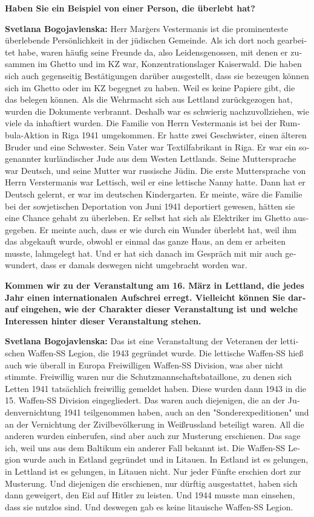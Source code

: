 \begin{otherlanguage}{ngerman}
\textbf{Haben Sie ein Beispiel von einer Person, die überlebt hat?}

\textbf{Svetlana Bogojavlenska:}  Herr Marģers Vestermanis ist die prominenteste überlebende Persönlichkeit in der jüdischen Gemeinde. Als ich dort noch gearbeitet habe, waren häufig seine Freunde da, also Leidensgenossen, mit denen er zusammen im Ghetto und im KZ war, Konzentrationslager Kaiserwald. Die haben sich auch gegenseitig Bestätigungen darüber ausgestellt, dass sie bezeugen können sich im Ghetto oder im KZ begegnet zu haben. Weil es keine Papiere gibt, die das belegen können. Als die Wehrmacht sich aus Lettland zurückgezogen hat, wurden die Dokumente verbrannt. Deshalb war es schwierig nachzuvollziehen, wie viele da inhaftiert wurden. Die Familie von Herrn Vestermanis ist bei der Rumbula-Aktion in Riga 1941 umgekommen. Er hatte zwei Geschwister, einen älteren Bruder und eine Schwester. Sein Vater war Textilfabrikant in Riga. Er war ein sogenannter kurländischer Jude aus dem Westen Lettlands. Seine Muttersprache war Deutsch, und seine Mutter war russische Jüdin. Die erste Muttersprache von Herrn Verstermanis war Lettisch, weil er eine lettische Nanny hatte. Dann hat er Deutsch gelernt, er war im deutschen Kindergarten. Er meinte, wäre die Familie bei der sowjetischen Deportation von Juni 1941 deportiert gewesen, hätten sie eine Chance gehabt zu überleben. Er selbst hat sich als Elektriker im Ghetto ausgegeben. Er meinte auch, dass er wie durch ein Wunder überlebt hat, weil ihm das abgekauft wurde, obwohl er einmal das ganze Haus, an dem er arbeiten musste, lahmgelegt hat. Und er hat sich danach im Gespräch mit mir auch gewundert, dass er damals deswegen nicht umgebracht worden war.

\textbf{Kommen wir zu der Veranstaltung am 16. März in Lettland, die jedes Jahr einen internationalen Aufschrei erregt. Vielleicht können Sie darauf eingehen, wie der Charakter dieser Veranstaltung ist und welche Interessen hinter dieser Veranstaltung stehen.}

\textbf{Svetlana Bogojavlenska:} Das ist eine Veranstaltung der Veteranen der lettischen Waffen-SS Legion, die 1943 gegründet wurde. Die lettische Waffen-SS hieß auch wie überall in Europa Freiwilligen Waffen-SS Division, was aber nicht stimmte. Freiwillig waren nur die Schutzmannschaftsbataillone, zu denen sich Letten 1941 tatsächlich freiwillig gemeldet haben. Diese wurden dann 1943 in die 15. Waffen-SS Division eingegliedert. Das waren auch diejenigen, die an der Judenvernichtung 1941 teilgenommen haben, auch an den "Sonderexpeditionen" und an der Vernichtung der Zivilbevölkerung in Weißrussland beteiligt waren. All die anderen wurden einberufen, sind aber auch zur Musterung erschienen. Das sage ich, weil uns aus dem Baltikum ein anderer Fall bekannt ist. Die Waffen-SS Legion wurde auch in Estland gegründet und in Litauen. In Estland ist es gelungen, in Lettland ist es gelungen, in Litauen nicht. Nur jeder Fünfte erschien dort zur Musterung. Und diejenigen die erschienen, nur dürftig ausgestattet, haben sich dann geweigert, den Eid auf Hitler zu leisten. Und 1944 musste man einsehen, dass sie nutzlos sind. Und deswegen gab es keine litauische Waffen-SS Legion. 


\end{otherlanguage}
